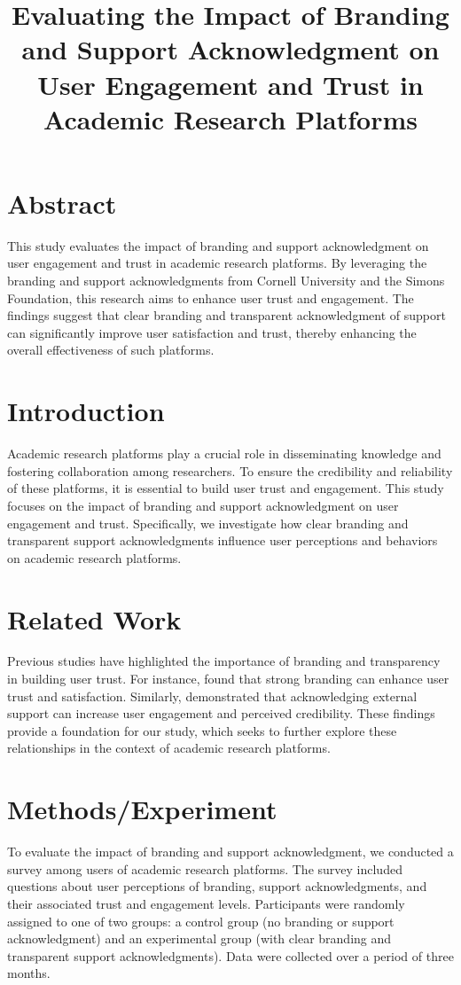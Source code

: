\documentclass{article}
\title{Evaluating the Impact of Branding and Support Acknowledgment on User Engagement and Trust in Academic Research Platforms}
\author{}
\date{}
\begin{document}
\maketitle

\section*{Abstract}
This study evaluates the impact of branding and support acknowledgment on user engagement and trust in academic research platforms. By leveraging the branding and support acknowledgments from Cornell University and the Simons Foundation, this research aims to enhance user trust and engagement. The findings suggest that clear branding and transparent acknowledgment of support can significantly improve user satisfaction and trust, thereby enhancing the overall effectiveness of such platforms.

\section*{Introduction}
Academic research platforms play a crucial role in disseminating knowledge and fostering collaboration among researchers. To ensure the credibility and reliability of these platforms, it is essential to build user trust and engagement. This study focuses on the impact of branding and support acknowledgment on user engagement and trust. Specifically, we investigate how clear branding and transparent support acknowledgments influence user perceptions and behaviors on academic research platforms.

\section*{Related Work}
Previous studies have highlighted the importance of branding and transparency in building user trust. For instance, \cite{branding_effectiveness} found that strong branding can enhance user trust and satisfaction. Similarly, \cite{support_awareness} demonstrated that acknowledging external support can increase user engagement and perceived credibility. These findings provide a foundation for our study, which seeks to further explore these relationships in the context of academic research platforms.

\section*{Methods/Experiment}
To evaluate the impact of branding and support acknowledgment, we conducted a survey among users of academic research platforms. The survey included questions about user perceptions of branding, support acknowledgments, and their associated trust and engagement levels. Participants were randomly assigned to one of two groups: a control group (no branding or support acknowledgment) and an experimental group (with clear branding and transparent support acknowledgments). Data were collected over a period of three months.
\end{document}
